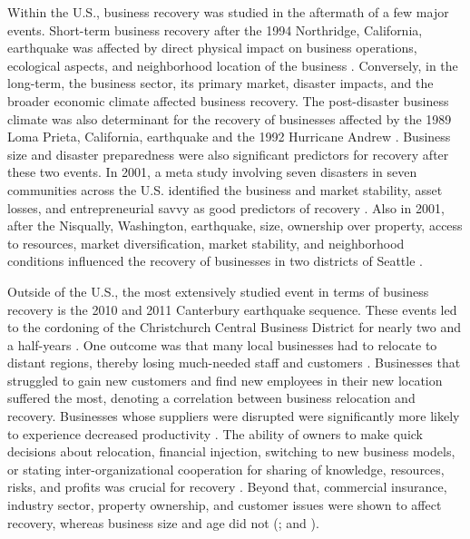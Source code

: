 Within the U.S., business recovery was studied in the aftermath of a few major events. Short-term business recovery after the 1994 Northridge, California, earthquake was affected by direct physical impact on business operations, ecological aspects, and neighborhood location of the business \citep{dahlhamer1998rebounding}. Conversely, in the long-term, the business sector, its primary market, disaster impacts, and the broader economic climate affected business recovery. The post-disaster business climate was also determinant for the recovery of businesses affected by the 1989 Loma Prieta, California, earthquake and the 1992 Hurricane Andrew \citep{webb2002predicting}. Business size and disaster preparedness were also significant predictors for recovery after these two events. In 2001, a meta study involving seven disasters in seven communities across the U.S. identified the business and market stability, asset losses, and entrepreneurial savvy as good predictors of recovery \citep{alesch2001organizations}. Also in 2001, after the Nisqually, Washington, earthquake, size, ownership over property, access to resources, market diversification, market stability, and neighborhood conditions influenced the recovery of businesses in two districts of Seattle \citep{chang2002disaster}. \

Outside of the U.S., the most extensively studied event in terms of business recovery is the 2010 and 2011 Canterbury earthquake sequence. These events led to the cordoning of the Christchurch Central Business District for nearly two and a half-years \citep{brown2019business}. One outcome was that many local businesses had to relocate to distant regions, thereby losing much-needed staff and customers \citep{morrish2020post}. Businesses that struggled to gain new customers and find new employees in their new location suffered the most, denoting a correlation between business relocation and recovery. Businesses whose suppliers were disrupted were significantly more likely to experience decreased productivity \citep{brown2019business}. The ability of owners to make quick decisions about relocation, financial injection, switching to new business models, or stating inter-organizational cooperation for sharing of knowledge, resources, risks, and profits was crucial for recovery \citep{stevenson2014organizational,morrish2011entrepreneurial}. Beyond that, commercial insurance, industry sector, property ownership, and customer issues were shown to affect recovery, whereas business size and age did not (\cite{brown2017efficacy,brown2015factors}; and \cite{kachali2015industry}). \

